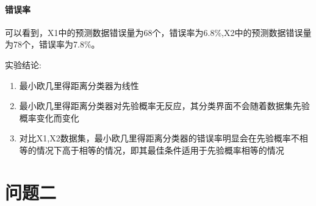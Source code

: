 \documentclass[UTF8]{article} %
\begin{document}
    \paragraph{错误率}  可以看到，X1中的预测数据错误量为68个，错误率为6.8\%,X2中的预测数据错误量为78个，错误率为7.8\%。

    实验结论:
    \begin{enumerate}
        \item 最小欧几里得距离分类器为线性
        \item 最小欧几里得距离分类器对先验概率无反应，其分类界面不会随着数据集先验概率变化而变化
        \item 对比X1,X2数据集，最小欧几里得距离分类器的错误率明显会在先验概率不相等的情况下高于相等的情况，即其最佳条件适用于先验概率相等的情况
    \end{enumerate}

    \section{问题二}
\end{document}
